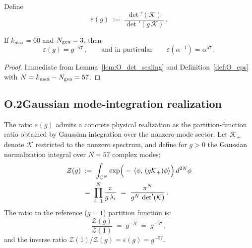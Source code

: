 \begin{definition}
\label{def:O_eps}
Define
\begin{equation}
\varepsilon(g)\;:=\;\frac{\det'(\mathcal{K})}{\det'(g\,\mathcal{K})}\,.
\end{equation}
\end{definition}

\begin{corollary}
\label{cor:O_alpha57}
If $k_{\max}=60$ and $N_{\rm gen}=3$, then
\begin{equation}
\varepsilon(g)=g^{-57}\,,
\qquad\text{and in particular}\qquad
\varepsilon(\alpha^{-1})=\alpha^{57}\,.
\end{equation}
\end{corollary}

\begin{proof}
Immediate from Lemma~\ref{lem:O_det_scaling} and Definition~\ref{def:O_eps} with $N=k_{\max}-N_{\rm gen}=57$.
\end{proof}

\subsection{O.2\quad Gaussian mode-integration realization}\label{sec:O-gaussian}

The ratio $\varepsilon(g)$ admits a concrete physical realization as the partition-function ratio
obtained by Gaussian integration over the nonzero-mode sector.
Let $\mathcal{K}_+$ denote $\mathcal{K}$ restricted to the nonzero spectrum,
and define for $g > 0$ the Gaussian normalization integral over $N = 57$ complex modes:
\begin{align}
\mathcal{Z}(g)\;&:=\;\int_{\mathbb{C}^{N}} \exp\!\Big(-\,\langle \phi,\,(g\mathcal{K}_+)\phi\rangle\Big)\,d^{2N}\phi
\notag\\
&=\; \prod_{i=1}^{N} \frac{\pi}{g\,\lambda_i}
\;=\; \frac{\pi^N}{g^N\,\det'(\mathcal{K})}\,.
\label{eq:O_partition}
\end{align}
The ratio to the reference ($g = 1$) partition function is:
\begin{equation}
\frac{\mathcal{Z}(g)}{\mathcal{Z}(1)}
\;=\; g^{-N}
\;=\; g^{-57}\,,
\label{eq:O_Zratio}
\end{equation}
and the inverse ratio $\mathcal{Z}(1)/\mathcal{Z}(g) = \varepsilon(g) = g^{-57}$.

